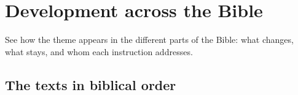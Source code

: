 \chapter{Development across the Bible}

\begin{objetivo}
See how the theme appears in the different parts of the Bible: what changes,
what stays, and whom each instruction addresses.
\end{objetivo}

\distribuicaodotema

\section{The texts in biblical order}
\textosdotema[ordem=biblica]

